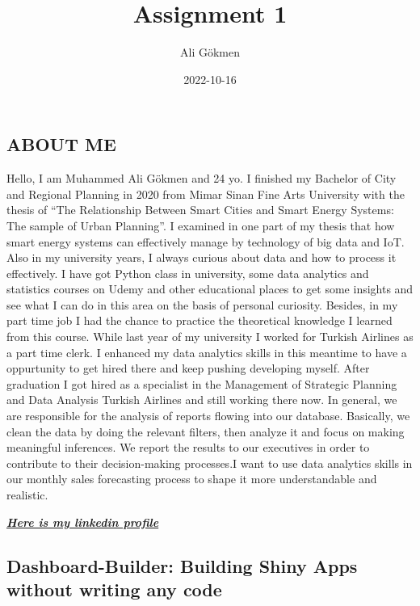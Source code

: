 \documentclass[
]{article}
\title{Assignment 1}
\author{Ali Gökmen}
\date{2022-10-16}
\begin{document}
\maketitle

\hypertarget{about-me}{%
\subsection{ABOUT ME}\label{about-me}}

Hello, I am Muhammed Ali Gökmen and 24 yo. I finished my Bachelor of
City and Regional Planning in 2020 from Mimar Sinan Fine Arts University
with the thesis of ``The Relationship Between Smart Cities and Smart
Energy Systems: The sample of Urban Planning''. I examined in one part
of my thesis that how smart energy systems can effectively manage by
technology of big data and IoT. Also in my university years, I always
curious about data and how to process it effectively. I have got Python
class in university, some data analytics and statistics courses on Udemy
and other educational places to get some insights and see what I can do
in this area on the basis of personal curiosity. Besides, in my part
time job I had the chance to practice the theoretical knowledge I
learned from this course. While last year of my university I worked for
Turkish Airlines as a part time clerk. I enhanced my data analytics
skills in this meantime to have a oppurtunity to get hired there and
keep pushing developing myself. After graduation I got hired as a
specialist in the Management of Strategic Planning and Data Analysis
Turkish Airlines and still working there now. In general, we are
responsible for the analysis of reports flowing into our database.
Basically, we clean the data by doing the relevant filters, then analyze
it and focus on making meaningful inferences. We report the results to
our executives in order to contribute to their decision-making
processes.I want to use data analytics skills in our monthly sales
forecasting process to shape it more understandable and realistic.

\href{https://www.linkedin.com/in/maligokmen/}{\textbf{\emph{Here is my
linkedin profile}}}

\hypertarget{dashboard-builder-building-shiny-apps-without-writing-any-code}{%
\subsection{\texorpdfstring{\textbf{Dashboard-Builder: Building Shiny
Apps without writing any
code}}{Dashboard-Builder: Building Shiny Apps without writing any code}}\label{dashboard-builder-building-shiny-apps-without-writing-any-code}}
\end{document}
